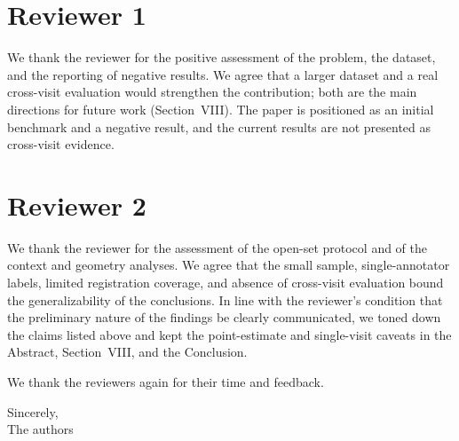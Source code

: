 \documentclass[11pt,a4paper]{article}
\begin{document}
\section*{Reviewer 1}

We thank the reviewer for the positive assessment of the problem, the dataset,
and the reporting of negative results. We agree that a larger dataset and a real
cross-visit evaluation would strengthen the contribution; both are the main
directions for future work (Section~VIII). The paper is positioned as an initial
benchmark and a negative result, and the current results are not presented as
cross-visit evidence.

\section*{Reviewer 2}

We thank the reviewer for the assessment of the open-set protocol and of the
context and geometry analyses. We agree that the small sample, single-annotator
labels, limited registration coverage, and absence of cross-visit evaluation bound
the generalizability of the conclusions. In line with the reviewer's condition
that the preliminary nature of the findings be clearly communicated, we toned down
the claims listed above and kept the point-estimate and single-visit caveats in
the Abstract, Section~VIII, and the Conclusion.

\vspace{0.5em}

We thank the reviewers again for their time and feedback.

\medskip

Sincerely,\\
The authors
\end{document}

